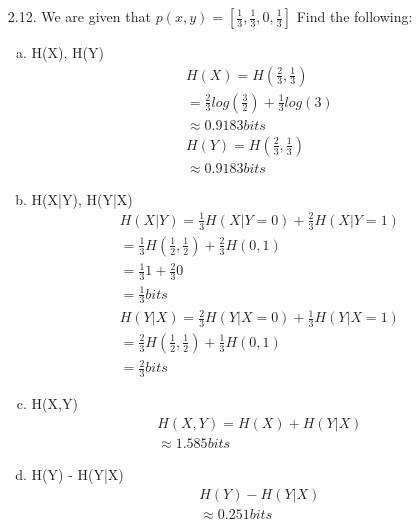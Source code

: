 \documentclass[10pt]{article}
\begin{document}
\begin{itemize}
\begin{enumerate}[a)]
          \end{enumerate}
          
          
          
        \item[2.12.] 
       We are given that  \( p(x,y)=\left[ \frac{1}{3},\frac{1}{3},0,\frac{1}{3} \right] \) Find the following:
       
          \begin{enumerate}[a)]
            \item  H(X), H(Y)
              \begin{eqnarray*}
                H(X) = H(\frac{2}{3},\frac{1}{3})\\
                = \frac{2}{3} log(\frac{3}{2}) + \frac{1}{3}
                log(3)\\
                \approx 0.9183 bits \\
                H(Y) =  H(\frac{2}{3},\frac{1}{3})\\
                \approx 0.9183 bits
              \end{eqnarray*}
            \item H(X|Y), H(Y|X)
              \begin{eqnarray*}
                H(X|Y) = \frac{1}{3}H(X|Y=0) + \frac{2}{3}H(X|Y=1)\\
                =\frac{1}{3}H(\frac{1}{2},\frac {1}{2})+\frac{2}{3}H(0,1)\\
                =\frac{1}{3}1+\frac{2}{3}0 \\
                = \frac{1}{3} bits \\
                H(Y|X) = \frac{2}{3}H(Y|X=0)+\frac{1}{3}H(Y|X=1)\\
                =\frac{2}{3}H(\frac{1}{2},\frac{1}{2}) + \frac{1}{3}H(0,1)\\
                =\frac{2}{3} bits
              \end{eqnarray*}
            \item H(X,Y)
           	 \begin{eqnarray*}
            		H(X,Y)=H(X)+H(Y|X)\\
			\approx 1.585 bits
          	  \end{eqnarray*}
            \item H(Y) - H(Y|X)
            	\begin{eqnarray*}
			H(Y) - H(Y|X)\\ \approx 0.251 bits
		\end{eqnarray*}
            	

\end{enumerate}
\end{itemize}
\end{document}

